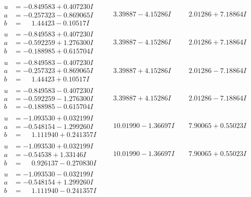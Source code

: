 \documentclass[1p]{elsarticle_modified}
\theoremstyle{definition}
\begin{document}
$$\begin{array}{c|c|c}
\begin{aligned}
u &= -0.849583 + 0.407230 I \\
a &= -0.257323 - 0.869065 I \\
b &= \phantom{-}1.44423 - 0.10517 I\end{aligned}
 & \phantom{-}3.39887 - 4.15286 I & \phantom{-}2.01286 + 7.18864 I \\ \hline\begin{aligned}
u &= -0.849583 + 0.407230 I \\
a &= -0.592259 + 1.276300 I \\
b &= -0.188985 + 0.615704 I\end{aligned}
 & \phantom{-}3.39887 - 4.15286 I & \phantom{-}2.01286 + 7.18864 I \\ \hline\begin{aligned}
u &= -0.849583 - 0.407230 I \\
a &= -0.257323 + 0.869065 I \\
b &= \phantom{-}1.44423 + 0.10517 I\end{aligned}
 & \phantom{-}3.39887 + 4.15286 I & \phantom{-}2.01286 - 7.18864 I \\ \hline\begin{aligned}
u &= -0.849583 - 0.407230 I \\
a &= -0.592259 - 1.276300 I \\
b &= -0.188985 - 0.615704 I\end{aligned}
 & \phantom{-}3.39887 + 4.15286 I & \phantom{-}2.01286 - 7.18864 I \\ \hline\begin{aligned}
u &= -1.093530 + 0.032199 I \\
a &= -0.548154 - 1.299260 I \\
b &= \phantom{-}1.111940 + 0.241357 I\end{aligned}
 & \phantom{-}10.01990 - 1.36697 I & \phantom{-}7.90065 + 0.55023 I \\ \hline\begin{aligned}
u &= -1.093530 + 0.032199 I \\
a &= -0.54538 + 1.33146 I \\
b &= \phantom{-}0.926137 - 0.270830 I\end{aligned}
 & \phantom{-}10.01990 - 1.36697 I & \phantom{-}7.90065 + 0.55023 I \\ \hline\begin{aligned}
u &= -1.093530 - 0.032199 I \\
a &= -0.548154 + 1.299260 I \\
b &= \phantom{-}1.111940 - 0.241357 I\end{aligned}

\end{array}$$
\end{document}
